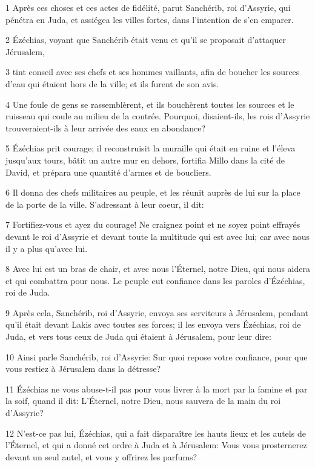 \par 1 Après ces choses et ces actes de fidélité, parut Sanchérib, roi d'Assyrie, qui pénétra en Juda, et assiégea les villes fortes, dans l'intention de s'en emparer.
\par 2 Ézéchias, voyant que Sanchérib était venu et qu'il se proposait d'attaquer Jérusalem,
\par 3 tint conseil avec ses chefs et ses hommes vaillants, afin de boucher les sources d'eau qui étaient hors de la ville; et ils furent de son avis.
\par 4 Une foule de gens se rassemblèrent, et ils bouchèrent toutes les sources et le ruisseau qui coule au milieu de la contrée. Pourquoi, disaient-ils, les rois d'Assyrie trouveraient-ils à leur arrivée des eaux en abondance?
\par 5 Ézéchias prit courage; il reconstruisit la muraille qui était en ruine et l'éleva jusqu'aux tours, bâtit un autre mur en dehors, fortifia Millo dans la cité de David, et prépara une quantité d'armes et de boucliers.
\par 6 Il donna des chefs militaires au peuple, et les réunit auprès de lui sur la place de la porte de la ville. S'adressant à leur coeur, il dit:
\par 7 Fortifiez-vous et ayez du courage! Ne craignez point et ne soyez point effrayés devant le roi d'Assyrie et devant toute la multitude qui est avec lui; car avec nous il y a plus qu'avec lui.
\par 8 Avec lui est un bras de chair, et avec nous l'Éternel, notre Dieu, qui nous aidera et qui combattra pour nous. Le peuple eut confiance dans les paroles d'Ézéchias, roi de Juda.
\par 9 Après cela, Sanchérib, roi d'Assyrie, envoya ses serviteurs à Jérusalem, pendant qu'il était devant Lakis avec toutes ses forces; il les envoya vers Ézéchias, roi de Juda, et vers tous ceux de Juda qui étaient à Jérusalem, pour leur dire:
\par 10 Ainsi parle Sanchérib, roi d'Assyrie: Sur quoi repose votre confiance, pour que vous restiez à Jérusalem dans la détresse?
\par 11 Ézéchias ne vous abuse-t-il pas pour vous livrer à la mort par la famine et par la soif, quand il dit: L'Éternel, notre Dieu, nous sauvera de la main du roi d'Assyrie?
\par 12 N'est-ce pas lui, Ézéchias, qui a fait disparaître les hauts lieux et les autels de l'Éternel, et qui a donné cet ordre à Juda et à Jérusalem: Vous vous prosternerez devant un seul autel, et vous y offrirez les parfums?
